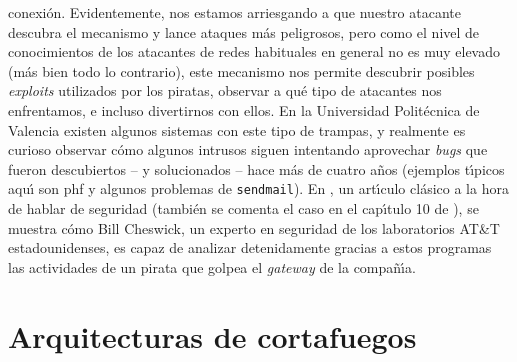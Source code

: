 conexi\'on. Evidentemente, nos estamos arriesgando a que nuestro atacante 
descubra el mecanismo y lance ataques m\'as peligrosos, pero como el nivel de 
conocimientos de los atacantes de redes habituales en general no es muy elevado
(m\'as bien todo lo contrario), este mecanismo nos permite descubrir posibles
{\it exploits} utilizados por los piratas, observar a qu\'e tipo de atacantes 
nos enfrentamos, e incluso divertirnos con ellos. En la Universidad 
Polit\'ecnica de Valencia existen algunos sistemas con este tipo de trampas, y
realmente es curioso observar c\'omo algunos intrusos siguen intentando 
aprovechar {\it bugs} que fueron descubiertos -- y solucionados -- hace m\'as 
de cuatro a\~nos (ejemplos t\'{\i}picos aqu\'{\i} son {\sc phf} y algunos 
problemas de {\tt sendmail}). En \cite{kn:ches92}, un art\'{\i}culo cl\'asico
a la hora de hablar de seguridad (tambi\'en se comenta el caso en el 
cap\'{\i}tulo 10 de \cite{kn:che94}), se muestra c\'omo Bill Cheswick, un 
experto en seguridad de los
laboratorios AT\&T estadounidenses, es capaz de analizar detenidamente gracias
a estos programas las actividades de un pirata que golpea el {\it gateway} de 
la compa\~n\'{\i}a.
\section{Arquitecturas de cortafuegos}
\label{arq}
